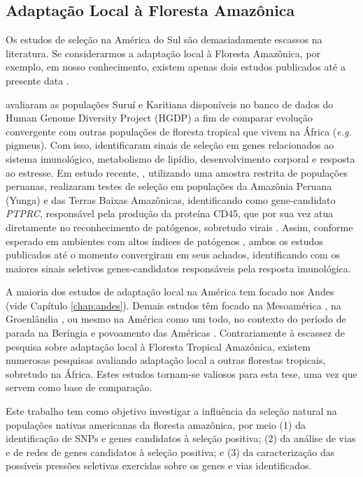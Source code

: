 \subsection{Adaptação Local à Floresta Amazônica}

Os estudos de seleção na América do Sul são demasiadamente escassos na literatura. Se considerarmos a adaptação local à Floresta Amazônica, por exemplo, em nosso conhecimento, existem apenas dois estudos publicados até a presente data \cite{amorim_detection_2015,borda_genetic_2020}.

 avaliaram as populações Suruí e Karitiana disponíveis no banco de dados do Human Genome Diversity Project (HGDP)  \cite{cann_human_2002,rosenberg_genetic_2002} a fim de comparar evolução convergente com outras populações de floresta tropical que vivem na África (\emph{e.g.} pigmeus). Com isso, identificaram sinais de seleção em genes relacionados ao sistema imunológico, metabolismo de lipídio, desenvolvimento corporal e resposta ao estresse. Em estudo recente, , utilizando uma amostra restrita de populações peruanas, realizaram testes de seleção em populações da Amazônia Peruana (Yunga) e das Terras Baixas Amazônicas, identificando como gene-candidato \textsl{PTPRC}, responsável pela produção da proteína CD45, que por sua vez atua diretamente no reconhecimento de patógenos, sobretudo virais \cite{borda_genetic_2020}. Assim, conforme esperado em ambientes com altos índices de patógenos \cite{guernier_ecology_2004}, ambos os estudos publicados até o momento convergiram em seus achados, identificando com os maiores sinais seletivos genes-candidatos responsáveis pela resposta imunológica.

A maioria dos estudos de adaptação local na América tem focado nos Andes (vide Capítulo \ref{chap:andes}). Demais estudos têm focado na Mesoamérica \cite{hunemeier_evolutionary_2012}, na Groenlândia \cite{fumagalli_greenlandic_2015}, ou mesmo na América como um todo, no contexto do período de parada na Beríngia e povoamento das Américas \cite{acuna-alonzo_functional_2010,amorim_genetic_2017}. Contrariamente à escassez de pesquisa sobre adaptação local à Floresta Tropical Amazônica, existem numerosas pesquisas avaliando adaptação local a outras florestas tropicais, sobretudo na África. Estes estudos tornam-se valiosos para esta tese, uma vez que servem como base de comparação.

Este trabalho tem como objetivo investigar a influência da seleção natural na populações nativas americanas da floresta amazônica, por meio (1) da identificação de SNPs e genes candidatos à seleção positiva; (2) da análise de vias e de redes de genes candidatos à seleção positiva; e (3) da caracterização das possíveis pressões seletivas exercidas sobre os genes e vias identificados.

